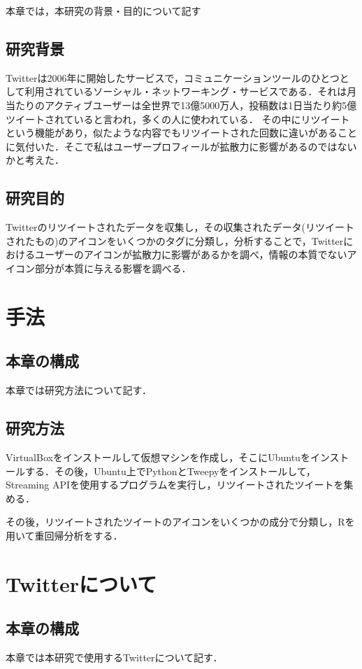 本章では，本研究の背景・目的について記す

\section{研究背景}
Twitterは2006年に開始したサービスで，コミュニケーションツールのひとつとして利用されているソーシャル・ネットワーキング・サービスである．それは月当たりのアクティブユーザーは全世界で13億5000万人，投稿数は1日当たり約5億ツイートされていると言われ，多くの人に使われている．
その中にリツイートという機能があり，似たような内容でもリツイートされた回数に違いがあることに気付いた．そこで私はユーザープロフィールが拡散力に影響があるのではないかと考えた．


\section{研究目的}
Twitterのリツイートされたデータを収集し，その収集されたデータ(リツイートされたもの)のアイコンをいくつかのタグに分類し，分析することで，Twitterにおけるユーザーのアイコンが拡散力に影響があるかを調べ，情報の本質でないアイコン部分が本質に与える影響を調べる．

\chapter{手法}

\section{本章の構成}
本章では研究方法について記す．

\section{研究方法}

VirtualBoxをインストールして仮想マシンを作成し，そこにUbuntuをインストールする．その後，Ubuntu上でPythonとTweepyをインストールして，Streaming APIを使用するプログラムを実行し，リツイートされたツイートを集める．

その後，リツイートされたツイートのアイコンをいくつかの成分で分類し，Rを用いて重回帰分析をする．



\chapter{Twitterについて}


\section{本章の構成}
本章では本研究で使用するTwitterについて記す．


